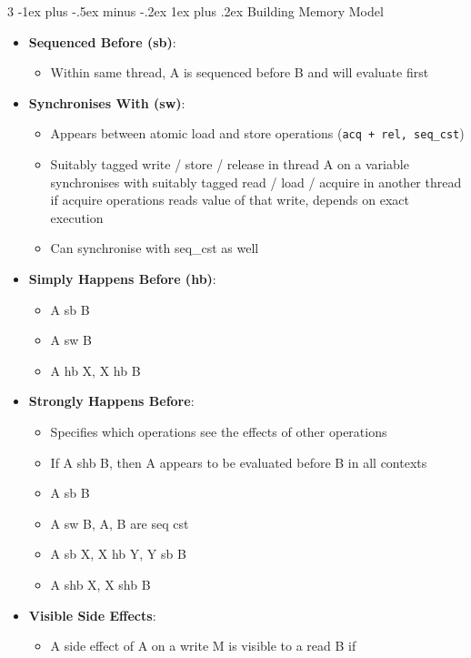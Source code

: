 \documentclass[10pt, landscape]{article}
\makeatletter
\renewcommand{\subsection}{\@startsection{subsection}{3}{0mm}%
                                {-1ex plus -.5ex minus -.2ex}%
                                {1ex plus .2ex}%
                                {\normalfont\small\bfseries}}%
\makeatother
\begin{document}
\begin{multicols*}{3}
\subsection{Building Memory Model}
\begin{itemize}
    \item \textbf{Sequenced Before (sb)}:
    \begin{itemize}
        \item Within same thread, A is sequenced before B and will evaluate first
    \end{itemize}
    \item \textbf{Synchronises With (sw)}:
    \begin{itemize}
        \item Appears between atomic load and store operations (\texttt{acq + rel, seq\_cst})
        \item Suitably tagged write / store / release in thread A on a variable synchronises with suitably tagged read / load / acquire in another thread if acquire operations reads value of that write, depends on exact execution
        \item Can synchronise with seq\_cst as well
    \end{itemize}
    \item \textbf{Simply Happens Before (hb)}:
    \begin{itemize}
        \item A sb B
        \item A sw B
        \item A hb X, X hb B
    \end{itemize}
    \item \textbf{Strongly Happens Before}:
    \begin{itemize}
        \item Specifies which operations see the effects of other operations
        \item If A shb B, then A appears to be evaluated before B in all contexts
        \item A sb B
        \item A sw B, A, B are seq cst
        \item A sb X, X hb Y, Y sb B
        \item A shb X, X shb B
    \end{itemize}
    \item \textbf{Visible Side Effects}:
    \begin{itemize}
        \item A side effect of A on a write M is visible to a read B if

\end{itemize}
\end{itemize}
\end{multicols*}
\end{document}
